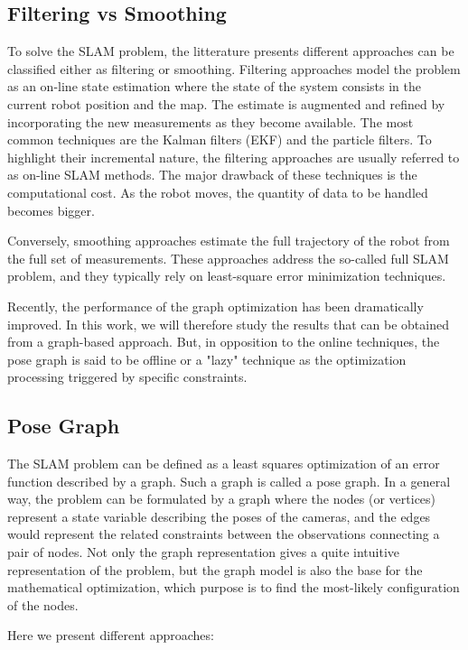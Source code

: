 \subsection{Filtering vs Smoothing}

To solve the SLAM problem, the litterature presents different approaches can be classified either as filtering or smoothing. Filtering approaches model the problem as an on-line state estimation where the state of the system consists in the current robot position and the map. The estimate is augmented and refined by incorporating the new measurements as they become available.
The most common techniques are the Kalman filters (EKF) and the particle filters. To highlight their incremental nature, the filtering approaches are usually referred to as on-line SLAM methods.
The major drawback of these techniques is the computational cost. As the robot moves, the quantity of data to be handled becomes bigger.

Conversely, smoothing approaches estimate the full trajectory of the robot from the full set of measurements. These approaches address the so-called full SLAM problem, and they typically rely on least-square error minimization techniques.

Recently, the performance of the graph optimization has been dramatically improved. In this work, we will therefore study the results that can be obtained from a graph-based approach. But, in opposition to the online techniques, the pose graph is said to be offline or a "lazy" technique as the optimization processing triggered by specific constraints.

\subsection{Pose Graph}

The SLAM problem can be defined as a least squares optimization of an error function described by a graph. Such a graph is called a pose graph. In a general way, the problem can be formulated by a graph where the nodes (or vertices) represent a state variable describing the poses of the cameras, and the edges would represent the related constraints between the observations connecting a pair of nodes. Not only the graph representation gives a quite intuitive representation of the problem, but the graph model is also the base for the mathematical optimization, which purpose is to find the most-likely configuration of the nodes.

Here we present different approaches:

